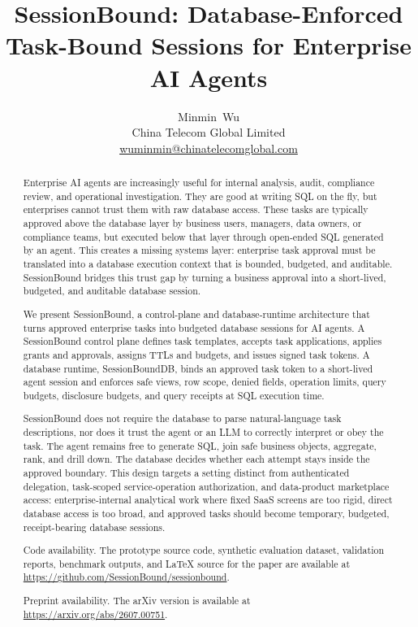 \documentclass[journal]{IEEEtran}
\title{SessionBound: Database-Enforced Task-Bound Sessions for
Enterprise AI Agents}
\author{Minmin~Wu\\
China Telecom Global Limited\\
\href{mailto:wuminmin@chinatelecomglobal.com}{wuminmin@chinatelecomglobal.com}}
\begin{document}
\maketitle

\begin{abstract}

Enterprise AI agents are increasingly useful for internal analysis,
audit, compliance review, and operational investigation. They are good
at writing SQL on the fly, but enterprises cannot trust them with raw
database access. These tasks are typically approved above the database
layer by business users, managers, data owners, or compliance teams, but
executed below that layer through open-ended SQL generated by an agent.
This creates a missing systems layer: enterprise task approval must be
translated into a database execution context that is bounded, budgeted,
and auditable. SessionBound bridges this trust gap by turning a business
approval into a short-lived, budgeted, and auditable database session.

We present SessionBound, a control-plane and database-runtime
architecture that turns approved enterprise tasks into budgeted
database sessions for AI agents. A SessionBound control plane defines
task templates, accepts task applications, applies grants and approvals,
assigns TTLs and budgets, and issues signed task tokens. A database
runtime, SessionBoundDB, binds an approved task token to a
short-lived agent session and enforces safe views, row scope, denied
fields, operation limits, query budgets, disclosure budgets, and query
receipts at SQL execution time.

SessionBound does not require the database to parse natural-language
task descriptions, nor does it trust the agent or an LLM to correctly
interpret or obey the task. The agent remains free to generate SQL, join
safe business objects, aggregate, rank, and drill down. The database
decides whether each attempt stays inside the approved boundary. This
design targets a setting distinct from authenticated delegation,
task-scoped service-operation authorization, and data-product
marketplace access: enterprise-internal analytical work where fixed SaaS
screens are too rigid, direct database access is too broad, and approved
tasks should become temporary, budgeted, receipt-bearing database
sessions.

Code availability. The prototype source code, synthetic
evaluation dataset, validation reports, benchmark outputs, and LaTeX
source for the paper are available at
\url{https://github.com/SessionBound/sessionbound}.
\par\noindent Preprint availability. The arXiv version is available at
\url{https://arxiv.org/abs/2607.00751}.
\end{abstract}
\end{document}
